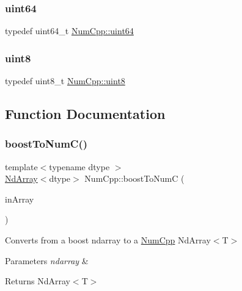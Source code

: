 \mbox{\label{namespace_num_cpp_a9b8a75722198a622843adfb37b1b2e9d}} 
\subsubsection{\texorpdfstring{uint64}{uint64}}
{\footnotesize\ttfamily typedef uint64\+\_\+t \mbox{\hyperlink{namespace_num_cpp_a9b8a75722198a622843adfb37b1b2e9d}{Num\+Cpp\+::uint64}}}

\mbox{\label{namespace_num_cpp_aee396d0469d6031cd18118c0a45bcdda}} 
\subsubsection{\texorpdfstring{uint8}{uint8}}
{\footnotesize\ttfamily typedef uint8\+\_\+t \mbox{\hyperlink{namespace_num_cpp_aee396d0469d6031cd18118c0a45bcdda}{Num\+Cpp\+::uint8}}}



\subsection{Function Documentation}
\mbox{\label{namespace_num_cpp_a5868211230328aff1a1d017a75aca374}} 
\subsubsection{\texorpdfstring{boost\+To\+Num\+C()}{boostToNumC()}}
{\footnotesize\ttfamily template$<$typename dtype $>$ \\
\mbox{\hyperlink{class_num_cpp_1_1_nd_array}{Nd\+Array}}$<$dtype$>$ Num\+Cpp\+::boost\+To\+NumC (\begin{DoxyParamCaption}\item[{boost\+::python\+::numpy\+::ndarray \&}]{in\+Array }\end{DoxyParamCaption})}

Converts from a boost ndarray to a \mbox{\hyperlink{namespace_num_cpp}{Num\+Cpp}} Nd\+Array$<$\+T$>$


\begin{DoxyParams}{Parameters}
{\em ndarray} & \\
\hline
\end{DoxyParams}
\begin{DoxyReturn}{Returns}
Nd\+Array$<$\+T$>$ 
\end{DoxyReturn}
\mbox{\label{namespace_num_cpp_a7006d46972c46ff7817ec6faa5b408f8}} 
